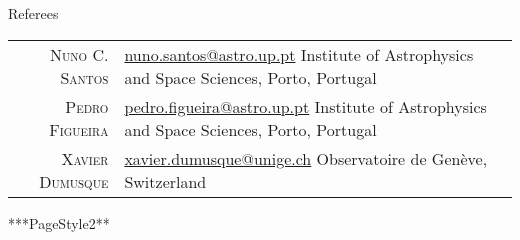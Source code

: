 \documentclass[10pt]{article}
\begin{document}
  \vspace{5cm}
  {\Large\scshape\raggedright\sffamily Referees}
  \newcommand{\service}[2]{
    \textsc{#1} & #2\\[1em]
  }
  \newcommand{\mail}[1]{
    \href{mailto:#1}{#1}
  }
  \begin{longtable}{r|p{10cm}}
    \service{Nuno C. Santos}{\mail{nuno.santos@astro.up.pt}\newline
                             Institute of Astrophysics and Space Sciences, Porto, Portugal}
    \service{Pedro Figueira}{\mail{pedro.figueira@astro.up.pt}\newline
                             Institute of Astrophysics and Space Sciences, Porto, Portugal}
    \service{Xavier Dumusque}{\mail{xavier.dumusque@unige.ch}\newline
                             Observatoire de Genève, Switzerland}
  \end{longtable}

\fi


***PageStyle2**
\end{document}
